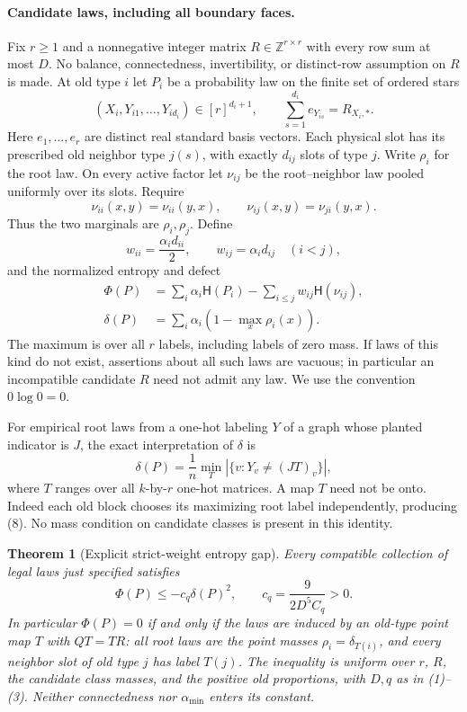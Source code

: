 \documentclass[11pt]{article}
\newtheorem{theorem}{Theorem}
\newcommand{\HH}{\mathsf H}
\begin{document}
\paragraph{Candidate laws, including all boundary faces.}
Fix $r\geq1$ and a nonnegative integer matrix $R\in\mathbb Z^{r\times r}$
with every row sum at most $D$. No balance, connectedness, invertibility,
or distinct-row assumption on $R$ is made. At old type $i$ let $P_i$
be a probability law on the finite set of ordered stars
\[
 (X_i,Y_{i1},\ldots,Y_{id_i})\in[r]^{d_i+1},
 \qquad \sum_{s=1}^{d_i}e_{Y_{is}}=R_{X_i,*}.       \tag{4}
\]
Here $e_1,\ldots,e_r$ are distinct real standard basis vectors.
Each physical slot has its prescribed old neighbor type $j(s)$,
with exactly $d_{ij}$ slots of type $j$.
Write $\rho_i$ for the root law. On every active factor let
$\nu_{ij}$ be the root--neighbor law pooled uniformly over its slots.
Require
\[
 \nu_{ii}(x,y)=\nu_{ii}(y,x),\qquad
 \nu_{ij}(x,y)=\nu_{ji}(y,x).                       \tag{5}
\]
Thus the two marginals are $\rho_i,\rho_j$.
Define
\[
 w_{ii}=\frac{\alpha_id_{ii}}2,\qquad
 w_{ij}=\alpha_id_{ij}\quad(i<j),                  \tag{6}
\]
and the normalized entropy and defect
\begin{align}
 \Phi(P)&=\sum_i\alpha_i\HH(P_i)
                     -\sum_{i\leq j}w_{ij}\HH(\nu_{ij}),\nonumber\\
 \delta(P)&=\sum_i\alpha_i(1-\max_x\rho_i(x)).       \tag{7}
\end{align}
The maximum is over all $r$ labels, including labels of zero mass.
If laws of this kind do not exist, assertions about all such laws
are vacuous; in particular an incompatible candidate $R$ need not
admit any law. We use the convention $0\log0=0$.

For empirical root laws from a one-hot labeling $Y$ of a graph whose
planted indicator is $J$, the exact interpretation of $\delta$ is
\[
 \delta(P)=\frac1n\min_T|\{v:Y_v\ne(JT)_v\}|,       \tag{8}
\]
where $T$ ranges over all $k$-by-$r$ one-hot matrices. A map $T$ need
not be onto. Indeed each old block chooses its maximizing root label
independently, producing (8). No mass condition on candidate classes
is present in this identity.

\begin{theorem}[Explicit strict-weight entropy gap]\label{thm:gap}
Every compatible collection of legal laws just specified satisfies
\[
 \boxed{\displaystyle
 \Phi(P)\leq-c_q\delta(P)^2,
 \qquad c_q=\frac{9}{2D^5C_q}>0.}                 \tag{9}
\]
In particular $\Phi(P)=0$ if and only if the laws are induced by an
old-type point map $T$ with $QT=TR$: all root laws are the point masses
$\rho_i=\delta_{T(i)}$, and every neighbor slot of old type $j$ has
label $T(j)$. The inequality is uniform over $r$, $R$, the candidate
class masses, and the positive old proportions, with $D,q$ as in
(1)--(3). Neither connectedness nor $\alpha_{\min}$ enters its constant.
\end{theorem}
\end{document}

